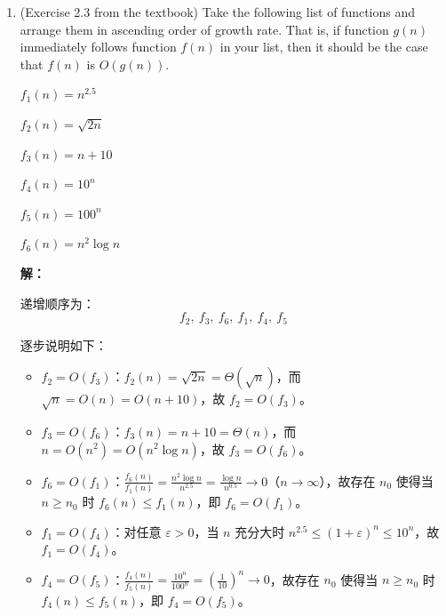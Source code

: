 \documentclass[12pt]{article}
\newenvironment{solution}{\par\noindent\textbf{解：}\par}{\par}
\begin{document}
\begin{enumerate}
    \item (Exercise 2.3 from the textbook) Take the following list of functions and arrange them in ascending order of growth rate. That is, if function $g(n)$ immediately follows function $f(n)$ in your list, then it should be the case that $f(n)$ is $O(g(n))$.

    \medskip
    \begin{center}
    $f_1(n) = n^{2.5}$

    $f_2(n) = \sqrt{2n}$

    $f_3(n) = n + 10$

    $f_4(n) = 10^n$

    $f_5(n) = 100^n$

    $f_6(n) = n^2 \log n$

    \end{center}

    \begin{solution}
        递增顺序为：
        $$
            f_2,\ f_3,\ f_6,\ f_1,\ f_4,\ f_5
        $$

        逐步说明如下：

        \begin{itemize}
            \item $f_2 = O(f_3)$：$f_2(n) = \sqrt{2n} = \Theta(\sqrt{n})$，而 $\sqrt{n} = O(n) = O(n + 10)$，故 $f_2 = O(f_3)$。

            \item $f_3 = O(f_6)$：$f_3(n) = n + 10 = \Theta(n)$，而 $n = O(n^2) = O(n^2 \log n)$，故 $f_3 = O(f_6)$。

            \item $f_6 = O(f_1)$：$\frac{f_6(n)}{f_1(n)} = \frac{n^2 \log n}{n^{2.5}} = \frac{\log n}{n^{0.5}} \to 0$（$n \to \infty$），故存在 $n_0$ 使得当 $n \geq n_0$ 时 $f_6(n) \leq f_1(n)$，即 $f_6 = O(f_1)$。

            \item $f_1 = O(f_4)$：对任意 $\varepsilon > 0$，当 $n$ 充分大时 $n^{2.5} \leq (1+\varepsilon)^n \leq 10^n$，故 $f_1 = O(f_4)$。

            \item $f_4 = O(f_5)$：$\frac{f_4(n)}{f_5(n)} = \frac{10^n}{100^n} = \left(\frac{1}{10}\right)^n \to 0$，故存在 $n_0$ 使得当 $n \geq n_0$ 时 $f_4(n) \leq f_5(n)$，即 $f_4 = O(f_5)$。
        \end{itemize}
    \end{solution}

    \bigskip


\end{enumerate}
\end{document}
